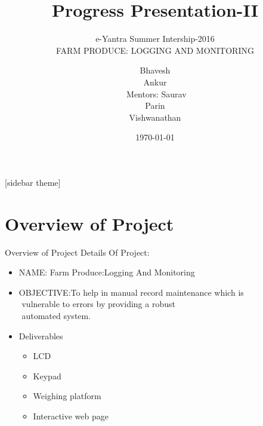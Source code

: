 \documentclass[10pt, a4paper]{beamer}
\begin{document}
	\title{Progress Presentation-II}
	\subtitle{e-Yantra Summer Intership-2016 \\FARM PRODUCE: LOGGING AND MONITORING}
	\author{Bhavesh\\Ankur\\$ $\\$ $ \hspace{-0.7in} Mentors: Saurav\\Parin\\Vishwanathan}
	\date{\today}
	\frame{\titlepage}

[sidebar theme]
\section{Overview of Project}
\begin{frame}{Overview of Project}
	Details Of Project: \\
	\begin{itemize}
		\item NAME: \hspace{0.1in} Farm Produce:Logging And Monitoring
	
		 
		\item OBJECTIVE:\hspace{0.1in}To help in manual record maintenance which is\\$ $\hspace{0.85in} vulnerable to errors by providing a robust\\$ $\hspace{0.85in} automated system. 
		
		\item Deliverables
		\begin{itemize}
			\item LCD
			\item Keypad
			\item Weighing platform
			\item Interactive web page
		\end{itemize}
	\end{itemize}
\end{frame}
\end{document}

